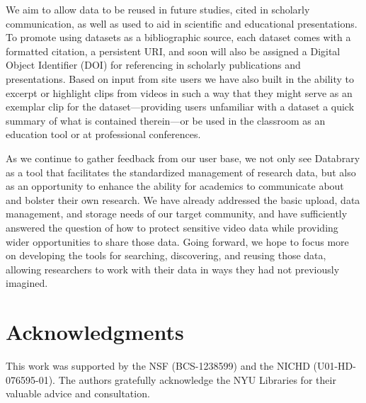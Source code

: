 \documentclass{sig-alternate-2013}
\begin{document}
We aim to allow data to be reused in future studies, cited in scholarly communication, as well as used to aid in scientific and educational presentations.
To promote using datasets as a bibliographic source, each dataset comes with a formatted citation, a persistent URI, and soon will also be assigned a Digital Object Identifier (DOI) for referencing in scholarly publications and presentations.
Based on input from site users we have also built in the ability to excerpt or highlight clips from videos in such a way that they might serve as an exemplar clip for the dataset---providing users unfamiliar with a dataset a quick summary of what is contained therein---or be used in the classroom as an education tool or at professional conferences.

As we continue to gather feedback from our user base, we not only see Databrary as a tool that facilitates the standardized management of research data, but also as an opportunity to enhance the ability for academics to communicate about and bolster their own research.
We have already addressed the basic upload, data management, and storage needs of our target community, and have sufficiently answered the question of how to protect sensitive video data while providing wider opportunities to share those data.
Going forward, we hope to focus more on developing the tools for searching, discovering, and reusing those data, allowing researchers to work with their data in ways they had not previously imagined.

\section*{Acknowledgments}

This work was supported by the NSF (BCS-1238599) and the NICHD (U01-HD-076595-01).
The authors gratefully acknowledge the NYU Libraries for their valuable advice and consultation.
\end{document}
